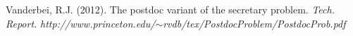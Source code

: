 \documentclass[12pt, A4paper, oneside]{article}
\theoremstyle{plain}
\numberwithin{equation}{section}
\begin{document}
\begin{thebibliography}{99}

{\sc Vanderbei, R.J.} (2012).
The postdoc variant of the secretary problem.
{\em Tech. Report.} {\em http://www.princeton.edu/$\sim$rvdb/tex/PostdocProblem/PostdocProb.pdf}


\end{thebibliography}












\end{document}

